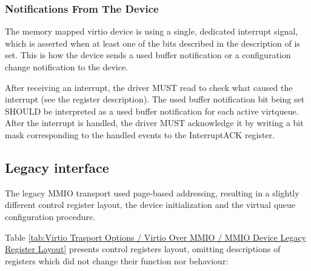 \subsubsection{Notifications From The Device}\label{sec:Virtio Transport Options / Virtio Over MMIO / MMIO-specific Initialization And Device Operation / Notifications From The Device}

The memory mapped virtio device is using a single, dedicated
interrupt signal, which is asserted when at least one of the
bits described in the description of 
is set. This is how the device sends a used buffer notification
or a configuration change notification to the device.

After receiving an interrupt, the driver MUST read
 to check what caused the interrupt (see the
register description).  The used buffer notification bit being set
SHOULD be interpreted as a used buffer notification for each active
virtqueue.  After the interrupt is handled, the driver MUST acknowledge
it by writing a bit mask corresponding to the handled events to the
InterruptACK register.

\subsection{Legacy interface}\label{sec:Virtio Transport Options / Virtio Over MMIO / Legacy interface}

The legacy MMIO transport used page-based addressing, resulting
in a slightly different control register layout, the device
initialization and the virtual queue configuration procedure.

Table \ref{tab:Virtio Trasport Options / Virtio Over MMIO / MMIO Device Legacy Register Layout} 
presents control registers layout, omitting
descriptions of registers which did not change their function
nor behaviour:


